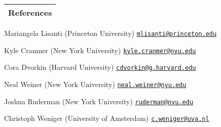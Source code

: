 \documentclass[letterpaper,11pt]{article}
\newenvironment{packed_itemize}{
\begin{itemize}[label=\raisebox{0.25ex}{\tiny$\bullet$}]
  \setlength{\itemsep}{3.9pt}
  \setlength{\parskip}{0pt}
  \setlength{\parsep}{0pt}}{\end{itemize}
}
\begin{document}

\noindent
\begin{tabular*}{\textwidth}{l@{\extracolsep{\fill}}}
\large {\sc \Large{References}}\\
\hline
\end{tabular*}\vspace{1.mm}

\begin{packed_itemize}
  \item Mariangela Lisanti (Princeton University) \hfill \href{mailto:mlisanti@princeton.edu}{\texttt{mlisanti@princeton.edu}}
  \item Kyle Cranmer (New York University) \hfill \href{mailto:kyle.cranmer@nyu.edu}{\texttt{kyle.cranmer@nyu.edu}}
  \item Cora Dvorkin (Harvard University) \hfill \href{mailto:cdvorkin@g.harvard.edu}{\texttt{cdvorkin@g.harvard.edu}}
  \item Neal Weiner (New York University) \hfill \href{mailto:neal.weiner@nyu.edu}{\texttt{neal.weiner@nyu.edu}}
  \item Joshua Ruderman (New York University) \hfill \href{mailto:ruderman@nyu.edu}{\texttt{ruderman@nyu.edu}}
  \item Christoph Weniger (University of Amsterdam) \hfill \href{mailto:c.weniger@uva.nl}{\texttt{c.weniger@uva.nl}}
\end{packed_itemize}


\vspace*{\fill}
\end{document}
